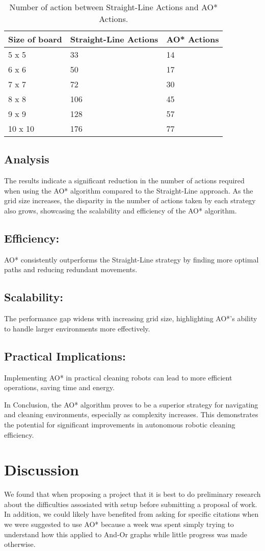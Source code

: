 \documentclass{article}
\begin{document}
\begin{table}[h]\centering
  \begin{tabular}{lll}
    \toprule
    Size of board& Straight-Line Actions & AO{*} Actions\\
    \midrule
    5 x 5& 33 & 14\\
    \midrule
    6 x 6& 50&17\\
    \midrule
    7 x 7& 72&30\\
    \midrule
    8 x 8&106&45\\
    \midrule
    9 x 9& 128&57\\
    \midrule
    10 x 10& 176& 77\\
     
    \bottomrule
  \end{tabular}
  \caption{Number of action between Straight-Line Actions and AO{*} Actions. }
  \label{tab:resultsEasy}
\end{table}
 
 
\subsection{Analysis}
The results indicate a significant reduction in the number of actions required when using the AO* algorithm compared to the Straight-Line approach. As the grid size increases, the disparity in the number of actions taken by each strategy also grows, showcasing the scalability and efficiency of the AO* algorithm.

\subsection{Efficiency:} AO* consistently outperforms the Straight-Line strategy by finding more optimal paths and reducing redundant movements.
\subsection{Scalability:} The performance gap widens with increasing grid size, highlighting AO*'s ability to handle larger environments more effectively.
\subsection{Practical Implications:} Implementing AO* in practical cleaning robots can lead to more efficient operations, saving time and energy.


In Conclusion, the AO* algorithm proves to be a superior strategy for navigating and cleaning environments, especially as complexity increases. This demonstrates the potential for significant improvements in autonomous robotic cleaning efficiency.


\section{Discussion}
We found that when proposing a project that it is best to do preliminary research about the difficulties assosiated with setup before submitting a proposal of work. In addition, we could likely have benefited from asking for specific citations when we were suggested to use AO* because a week was spent simply trying to understand how this applied to And-Or graphs while little progress was made otherwise. 
\end{document}
